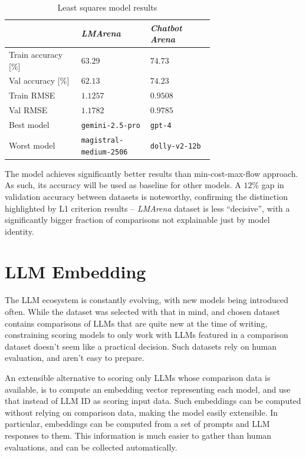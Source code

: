 \documentclass[a4paper,11pt,twoside]{report}
\theoremstyle{definition}
\begin{document}
\begin{table}[h]
    \centering
    \caption{Least squares model results}
    \begin{tabular}{
    >{\raggedright\arraybackslash}p{0.25\linewidth}
    >{\centering\arraybackslash}p{0.22\linewidth}
    >{\centering\arraybackslash}p{0.22\linewidth}
    }
        \toprule
        & \textit{LMArena} & \textit{Chatbot Arena} \\
        \midrule
        Train accuracy [\%]   & $63.29$ & $74.73$ \\
        Val accuracy [\%]     & $62.13$ & $74.23$ \\
        Train RMSE            & $1.1257$ & $0.9508$ \\
        Val RMSE              & $1.1782$ & $0.9785$ \\
        Best model            & \texttt{gemini-2.5-pro} & \texttt{gpt-4} \\
        Worst model           & \texttt{magistral-medium-2506} & \texttt{dolly-v2-12b} \\
        \bottomrule
    \end{tabular}
    \label{table:l2-model-results}
\end{table}

The model achieves significantly better results than min-cost-max-flow approach. As such, its accuracy will be used as baseline for other models. A $12 \%$ gap in validation accuracy between datasets is noteworthy, confirming the distinction highlighted by L1 criterion results -- \textit{LMArena} dataset is less ``decisive'', with a significantly bigger fraction of comparisons not explainable just by model identity.

\section{LLM Embedding}
\label{section:llm-embedding}

The LLM ecosystem is constantly evolving, with new models being introduced often. While the dataset was selected with that in mind, and chosen dataset contains comparisons of LLMs that are quite new at the time of writing, constraining scoring models to only work with LLMs featured in a comparison dataset doesn't seem like a practical decision. Such datasets rely on human evaluation, and aren't easy to prepare.

An extensible alternative to scoring only LLMs whose comparison data is available, is to compute an embedding vector representing each model, and use that instead of LLM ID as scoring input data. Such embeddings can be computed without relying on comparison data, making the model easily extensible. In particular, embeddings can be computed from a set of prompts and LLM responses to them. This information is much easier to gather than human evaluations, and can be collected automatically. 
\end{document}
